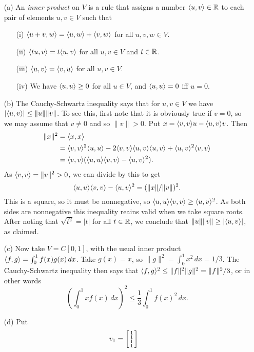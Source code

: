 \documentclass[a4paper]{article}
\begin{document}
\begin{solution}
 \begin{itemize}
  \item[(a)] An \emph{inner product} on $V$ is a rule that
   assigns a number $\langle u,v\rangle\in{\mathbb{R}}$ to each pair of elements
   $u,v\in V$ such that
   \begin{itemize}
    \item[(i)] $\langle u+v,w\rangle=\langle u,w\rangle+\langle v,w\rangle$ for all
     $u,v,w\in V$.
    \item[(ii)] $\langle tu,v\rangle=t\langle u,v\rangle$ for all $u,v\in V$ and
     $t\in{\mathbb{R}}$.
    \item[(iii)] $\langle u,v\rangle=\langle v,u\rangle$ for all $u,v\in V$.
    \item[(iv)] We have $\langle u,u\rangle\geq 0$ for all $u\in V$, and
     $\langle u,u\rangle=0$ iff $u=0$.
   \end{itemize}
  \item[(b)] The Cauchy-Schwartz inequality says that for
   $u,v\in V$ we have $|\langle u,v\rangle|\leq\|u\|\|v\|$.  To see
   this, first note that it is obviously true if $v=0$, so
   we may assume that $v\neq 0$ and so $\|v\|>0$.  Put
   $x=\langle v,v\rangle u-\langle u,v\rangle v$.  Then
   \begin{align*}
    \|x\|^2 & = \langle x,x\rangle \\
    &= \langle v,v\rangle^2\langle u,u\rangle - 2\langle v,v\rangle\langle u,v\rangle\langle u,v\rangle + \langle u,v\rangle^2\langle v,v\rangle \\
    &= \langle v,v\rangle(\langle u,u\rangle\langle v,v\rangle-\langle u,v\rangle^2).
   \end{align*}
   As $\langle v,v\rangle=\|v\|^2>0$, we can divide by this to get
   \[ \langle u,u\rangle\langle v,v\rangle - \langle u,v\rangle^2 =(\|x\|/\|v\|)^2. \]
   This is a square, so it must be nonnegative, so
   $\langle u,u\rangle\langle v,v\rangle\geq\langle u,v\rangle^2$.  As both sides are
   nonnegative this inequality reains valid when we take
   square roots.  After noting that $\sqrt{t^2}=|t|$ for all
   $t\in{\mathbb{R}}$, we conclude that $\|u\|\|v\|\geq|\langle u,v\rangle|$, as
   claimed. 
  \item[(c)] Now take $V=C[0,1]$, with the usual inner
   product $\langle f,g\rangle=\int_0^1 f(x)g(x)\,dx$.  Take
   $g(x)=x$, so $\|g\|^2=\int_0^1x^2\,dx=1/3$.  The
   Cauchy-Schwartz inequality then says that
   $\langle f,g\rangle^2\leq\|f\|^2\|g\|^2=\|f\|^2/3$, or in other
   words 
   \[ \left(\textstyle \int_0^1 x f(x)\,dx\right)^2 
       \leq \frac{1}{3}\int_0^1 f(x)^2\,dx.
   \]
  \item[(d)] Put
   \[ v_1 = \left[\begin{smallmatrix} 1\\1\\1\\1\end{smallmatrix}\right] \hspace{1em}
\]
\end{itemize}
\end{solution}
\end{document}
